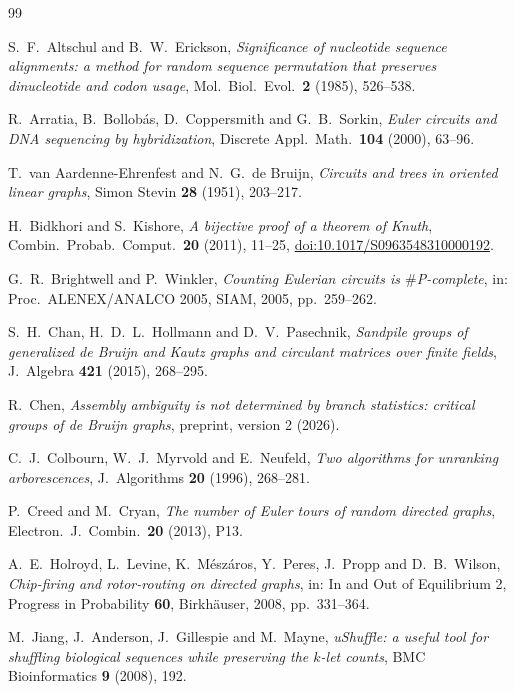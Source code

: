 \documentclass[11pt]{article}
\theoremstyle{plain}
\theoremstyle{definition}
\theoremstyle{remark}
\begin{document}
\begin{thebibliography}{99}

 S.~F.~Altschul and B.~W.~Erickson,
\emph{Significance of nucleotide sequence alignments: a method for random sequence
permutation that preserves dinucleotide and codon usage},
Mol.\ Biol.\ Evol.\ \textbf{2} (1985), 526--538.

 R.~Arratia, B.~Bollob\'as, D.~Coppersmith and G.~B.~Sorkin,
\emph{Euler circuits and DNA sequencing by hybridization},
Discrete Appl.\ Math.\ \textbf{104} (2000), 63--96.

 T.~van Aardenne-Ehrenfest and N.~G.~de Bruijn,
\emph{Circuits and trees in oriented linear graphs},
Simon Stevin \textbf{28} (1951), 203--217.

 H.~Bidkhori and S.~Kishore,
\emph{A bijective proof of a theorem of Knuth},
Combin.\ Probab.\ Comput.\ \textbf{20} (2011), 11--25,
\href{https://doi.org/10.1017/S0963548310000192}{doi:10.1017/S0963548310000192}.

 G.~R.~Brightwell and P.~Winkler,
\emph{Counting Eulerian circuits is $\#$P-complete},
in: Proc.\ ALENEX/ANALCO 2005, SIAM, 2005, pp.~259--262.

 S.~H.~Chan, H.~D.~L.~Hollmann and D.~V.~Pasechnik,
\emph{Sandpile groups of generalized de Bruijn and Kautz graphs and circulant matrices over
finite fields}, J.\ Algebra \textbf{421} (2015), 268--295.

 R.~Chen,
\emph{Assembly ambiguity is not determined by branch statistics: critical groups of de
Bruijn graphs}, preprint, version 2 (2026).

 C.~J.~Colbourn, W.~J.~Myrvold and E.~Neufeld,
\emph{Two algorithms for unranking arborescences},
J.\ Algorithms \textbf{20} (1996), 268--281.

 P.~Creed and M.~Cryan,
\emph{The number of Euler tours of random directed graphs},
Electron.\ J.\ Combin.\ \textbf{20} (2013), P13.

 A.~E.~Holroyd, L.~Levine, K.~M\'esz\'aros, Y.~Peres, J.~Propp and
D.~B.~Wilson, \emph{Chip-firing and rotor-routing on directed graphs},
in: In and Out of Equilibrium 2, Progress in Probability \textbf{60}, Birkh\"auser, 2008,
pp.~331--364.

 M.~Jiang, J.~Anderson, J.~Gillespie and M.~Mayne,
\emph{uShuffle: a useful tool for shuffling biological sequences while preserving the
$k$-let counts}, BMC Bioinformatics \textbf{9} (2008), 192.


\end{thebibliography}
\end{document}
